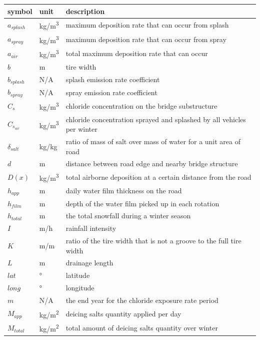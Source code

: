 \documentclass[12pt]{article}
\begin{document}
\renewcommand{\arraystretch}{1.2}
\noindent \begin{longtable*}{l l p{12cm}} \toprule
\textbf{symbol} & \textbf{unit} & \textbf{description}\\
\midrule 
$a_{splash}$ & \si{kg/m^3} & maximum deposition rate that can occur from splash\\
$a_{spray}$ & \si{kg/m^3} & maximum deposition rate that can occur from spray\\
$a_{air}$ & \si{kg/m^3} & total maximum deposition rate that can occur\\
$b$ & \si{m} & tire width\\
$b_{splash}$ & N/A & splash emission rate coefficient\\
$b_{spray}$ & N/A & spray emission rate coefficient\\
$C_s$ & \si{kg/m^3} & chloride concentration on the bridge substructure\\
$C_{s_{air}}$ & \si{kg/m^3} & chloride concentration sprayed and splashed by all vehicles per winter\\
$\delta_{salt}$ & kg/kg & ratio of mass of salt over mass of water for a unit area of road\\
$d$ & \si{m} & distance between road edge and nearby bridge structure\\
$D(x)$ & \si{kg/m^3} & total airborne deposition at a certain distance from the road\\
$h_{app}$ & \si{m} & daily water film thickness on the road\\
$h_{film}$ & \si{m} & depth of the water film picked up in each rotation\\
$h_{total}$ & \si{m} & the total snowfall during a winter season\\
$I$ & \si{m/h} & rainfall intensity\\
$K$ & m/m & ratio of the tire width that is not a groove to the full tire width\\
$L$ & \si{m} & drainage length\\
$lat$ & \si{\degree} & latitude\\
$long$ & \si{\degree} & longitude\\
$m$ & N/A & the end year for the chloride exposure rate period\\
$M_{app}$ & \si{kg/m^2} & deicing salts quantity applied per day\\
$M_{total}$ & \si{kg/m^2} & total amount of deicing salts quantity over winter\\

\end{longtable*}
\end{document}
